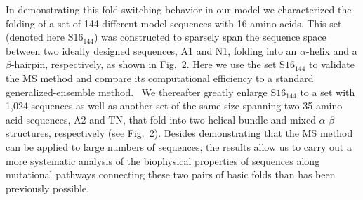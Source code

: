 \documentclass[
aip,
rsi,%
amsmath,amssymb,
reprint,%
]{revtex4-1}
\newcommand {\SR}		{${\mathrm{S16}_{144}}$}
\begin{document}
In demonstrating this fold-switching behavior in our model we characterized the folding of a set of 144 different model sequences with 16 amino acids. This set (denoted here {\SR}) was constructed to sparsely span the sequence space between two ideally designed sequences, A1 and N1, folding into an $\alpha$-helix and a $\beta$-hairpin, respectively, as shown in Fig.~2. Here we use the set {\SR} to validate the MS method and compare its computational efficiency to a standard generalized-ensemble method.~\cite{Marinari1992,Lyubartsev1992} We thereafter greatly enlarge {\SR} to a set with 1,024 sequences as well as another set of the same size spanning two 35-amino acid sequences, A2 and TN, that fold into two-helical bundle and mixed $\alpha$-$\beta$ structures, respectively (see Fig.~2). Besides demonstrating that the MS method can be applied to large numbers of sequences, the results allow us to carry out a more systematic analysis of the biophysical properties of sequences along mutational pathways connecting these two pairs of basic folds than has been previously possible. 

\end{document}
